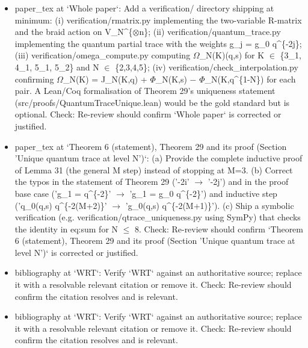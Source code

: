 \documentclass[11pt]{article}
\begin{document}
\begin{itemize}[leftmargin=*]
  \item [open] paper\_tex at `Whole paper`: Add a verification/ directory shipping at minimum: (i) verification/rmatrix.py implementing the two-variable R-matrix and the braid action on V\_N\^{}\{\ensuremath{\otimes}n\}; (ii) verification/quantum\_trace.py implementing the quantum partial trace with the weights g\_j = g\_0 q\^{}\{-2j\}; (iii) verification/omega\_compute.py computing \ensuremath{\Omega}\_N(K)(q,s) for K \ensuremath{\in} \{3\_1, 4\_1, 5\_1, 5\_2\} and N \ensuremath{\in} \{2,3,4,5\}; (iv) verification/check\_interpolation.py confirming \ensuremath{\Omega}\_N(K) = J\_N(K,q) + \ensuremath{\Phi}\_N(K,s) \ensuremath{-} \ensuremath{\Phi}\_N(K,q\^{}\{1-N\}) for each pair. A Lean/Coq formalisation of Theorem 29's uniqueness statement (src/proofs/QuantumTraceUnique.lean) would be the gold standard but is optional. Check: Re-review should confirm `Whole paper` is corrected or justified.
  \item [open] paper\_tex at `Theorem 6 (statement), Theorem 29 and its proof (Section 'Unique quantum trace at level N')`: (a) Provide the complete inductive proof of Lemma 31 (the general M step) instead of stopping at M=3. (b) Correct the typos in the statement of Theorem 29 ('-2i' \ensuremath{\to} '-2j') and in the proof base case ('g\_1 = q\^{}\{-2\}' \ensuremath{\to} 'g\_1 = g\_0 q\^{}\{-2\}') and inductive step ('q\_0(q,s) q\^{}\{-2(M+2)\}' \ensuremath{\to} 'g\_0(q,s) q\^{}\{-2(M+1)\}'). (c) Ship a symbolic verification (e.g. verification/qtrace\_uniqueness.py using SymPy) that checks the identity in eq:sum for N \ensuremath{\le} 8. Check: Re-review should confirm `Theorem 6 (statement), Theorem 29 and its proof (Section 'Unique quantum trace at level N')` is corrected or justified.
  \item [open] bibliography at `WRT`: Verify `WRT` against an authoritative source; replace it with a resolvable relevant citation or remove it. Check: Re-review should confirm the citation resolves and is relevant.
  \item [open] bibliography at `WRT`: Verify `WRT` against an authoritative source; replace it with a resolvable relevant citation or remove it. Check: Re-review should confirm the citation resolves and is relevant.
\end{itemize}
\end{document}
